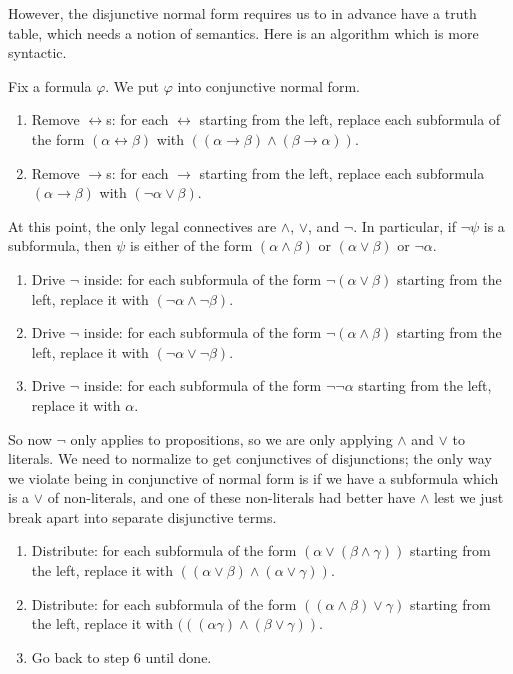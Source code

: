 \documentclass[../notes.tex]{subfiles}
\begin{document}
However, the disjunctive normal form requires us to in advance have a truth table, which needs a notion of semantics. Here is an algorithm which is more syntactic.
\begin{prop}
	Fix a formula $\varphi$. We put $\varphi$ into conjunctive normal form.
	\begin{enumerate}
		\item Remove $\leftrightarrow$s: for each $\leftrightarrow$ starting from the left, replace each subformula of the form $(\alpha\leftrightarrow\beta)$ with $((\alpha\to\beta)\land(\beta\to\alpha))$.
		\item Remove $\to$s: for each $\to$ starting from the left, replace each subformula $(\alpha\to\beta)$ with $(\lnot\alpha\lor\beta)$.
	\end{enumerate}
	At this point, the only legal connectives are $\land$, $\lor$, and $\lnot$. In particular, if $\lnot\psi$ is a subformula, then $\psi$ is either of the form $(\alpha\land\beta)$ or $(\alpha\lor\beta)$ or $\lnot\alpha$.
	\begin{enumerate}[resume]
		\item Drive $\lnot$ inside: for each subformula of the form $\lnot(\alpha\lor\beta)$ starting from the left, replace it with $(\lnot\alpha\land\lnot\beta)$.
		\item Drive $\lnot$ inside: for each subformula of the form $\lnot(\alpha\land\beta)$ starting from the left, replace it with $(\lnot\alpha\lor\lnot\beta)$.
		\item Drive $\lnot$ inside: for each subformula of the form $\lnot\lnot\alpha$ starting from the left, replace it with $\alpha$.
	\end{enumerate}
	So now $\lnot$ only applies to propositions, so we are only applying $\land$ and $\lor$ to literals. We need to normalize to get conjunctives of disjunctions; the only way we violate being in conjunctive of normal form is if we have a subformula which is a $\lor$ of non-literals, and one of these non-literals had better have $\land$ lest we just break apart into separate disjunctive terms.
	\begin{enumerate}[resume]
		\item Distribute: for each subformula of the form $(\alpha\lor(\beta\land\gamma))$ starting from the left, replace it with $((\alpha\lor\beta)\land(\alpha\lor\gamma))$.
		\item Distribute: for each subformula of the form $((\alpha\land\beta)\lor\gamma)$ starting from the left, replace it with $(((\alpha\gamma)\land(\beta\lor\gamma))$.
		\item Go back to step 6 until done.
	\end{enumerate}
\end{prop}
\end{document}

